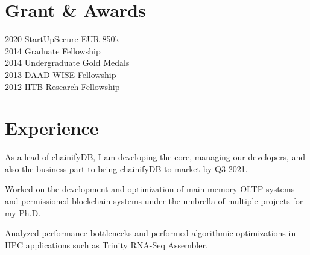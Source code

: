 \documentclass[]{deedy-resume-openfont}
\begin{document}
\begin{minipage}[t]{0.30\textwidth}
\section{Grant \& Awards}
2020 \textbullet{}  StartUpSecure EUR 850k \\
2014 \textbullet{}  Graduate Fellowship \\
2014 \textbullet{}  Undergraduate Gold Medals \\
2013 \textbullet{}  DAAD WISE Fellowship \\
2012 \textbullet{}  IITB Research Fellowship
\sectionsep

%
%

\end{minipage} 
\hfill
\begin{minipage}[t]{0.67\textwidth}
	

\section{Experience}

As a lead of chainifyDB, I am developing the core, managing our developers, and also the business part to bring chainifyDB to market by Q3 2021.

\sectionsep

Worked on the development and optimization of main-memory OLTP systems and permissioned blockchain systems under the umbrella of multiple projects for my Ph.D.

\sectionsep
{}
Analyzed performance bottlenecks and performed algorithmic optimizations in HPC applications such as Trinity RNA-Seq Assembler.

\sectionsep



\end{minipage}
\end{document}
